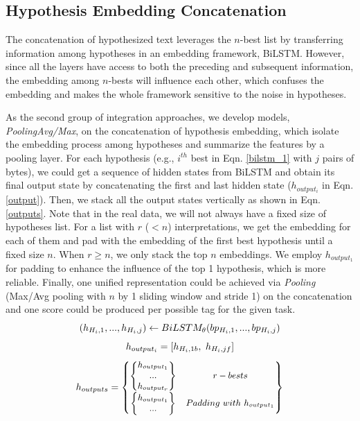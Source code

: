 \subsection{Hypothesis Embedding Concatenation}
The concatenation of hypothesized text leverages the $n$-best list by transferring information among hypotheses in an embedding framework, BiLSTM. However, since all the layers have access to both the preceding and subsequent information, the embedding among $n$-bests will influence each other, which confuses the embedding and makes the whole framework sensitive to the noise in hypotheses.

As the second group of integration approaches, we develop models, \textit{PoolingAvg/Max}, on the concatenation of hypothesis embedding, which isolate the embedding process among hypotheses and summarize the features by a pooling layer. For each hypothesis (e.g., $i^{th}$ best in Eqn. \ref{bilstm_1} with $j$ pairs of bytes), we could get a sequence of hidden states from BiLSTM and obtain its final output state by concatenating the first and last hidden state ($h_{output_i}$ in Eqn. \ref{output}).
Then, we stack  all the output states vertically as shown in Eqn. \ref{outputs}. Note that in the real data, we will not always have a fixed size of hypotheses list. For a list with $r$ ($<n$) interpretations, we get the embedding for each of them and pad with the embedding of the first best hypothesis until a fixed size $n$. When $r\geq n$, we only stack the top $n$ embeddings. We employ $h_{output_1}$ for padding to enhance the influence of the top 1 hypothesis, which is more reliable. Finally, one unified representation could be achieved via    \textit{Pooling} (Max/Avg pooling with $n$ by 1 sliding window and stride 1)  on the concatenation and one score could be produced per possible tag for the given task. 
\begin{equation}
\small{
	(h_{H_i, 1}, ... , h_{H_i, j})\leftarrow BiLSTM_{\theta}(bp_{H_i, 1},...,bp_{H_i, j})
}
\label{bilstm_1}
\end{equation}
\begin{equation}
\small{
	h_{output_i} = [h_{H_i, 1b},\ h_{H_i, jf}]
	\label{output}
}
\end{equation}
\begin{equation}
\small{
	h_{outputs} = \begin{Bmatrix}
	
	\begin{Bmatrix}
	h_{output_1}\\...\\ h_{output_r}
	\end{Bmatrix} & r-bests
	\\
	\begin{Bmatrix}
	h_{output_1}\\ ...
	\end{Bmatrix} & Padding\ with\ h_{output_1}
	\end{Bmatrix}
}
\label{outputs}
\end{equation}
